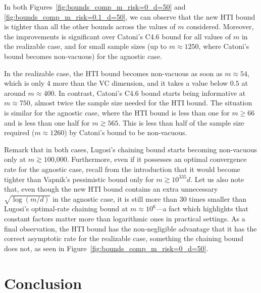 \documentclass[twoside,11pt]{article}
\begin{document}
In both Figures~\ref{fig:bounds_comp_m_risk=0_d=50} and \ref{fig:bounds_comp_m_risk=0.1_d=50}, we can observe that the new HTI bound is tighter than all the other bounds across the values of $m$ considered.
Moreover, the improvements is significant over Catoni's C4.6 bound for all values of $m$ in the realizable case, and for small sample sizes (up to $m\approx 1250$, where Catoni's bound becomes non-vacuous) for the agnostic case.

In the realizable case, the HTI bound becomes non-vacuous as soon as $m\approx 54$, which is only 4 more than the VC dimension, and it takes a value below $0.5$ at around $m\approx 400$.
In contrast, Catoni's C4.6 bound starts being informative at $m\approx 750$, almost twice the sample size needed for the HTI bound.
The situation is similar for the agnostic case, where the HTI bound is less than one for $m\ge 66$ and is less than one half for $m\gtrsim 565$.
This is less than half of the sample size required ($m\approx 1260$) by Catoni's bound to be non-vacuous.

Remark that in both cases, Lugosi's chaining bound starts becoming non-vacuous only at $m\gtrsim 100$,$000$.
Furthermore, even if it possesses an optimal convergence rate for the agnostic case, recall from the introduction that it would become tighter than Vapnik's pessimistic bound only for $m\gtrsim 10^{335}d$.
Let us also note that, even though the new HTI bound contains an extra unnecessary $\sqrt{\log(m/d)}$ in the agnostic case, it is still more than 30 times smaller than Lugosi's optimal-rate chaining bound at $m\approx 10^6$---a fact which highlights that constant factors matter more than logarithmic ones in practical settings.
As a final observation, the HTI bound has the non-negligible advantage that it has the correct asymptotic rate for the realizable case, something the chaining bound does not, as seen in Figure~\ref{fig:bounds_comp_m_risk=0_d=50}.










\section{Conclusion}
\end{document}
